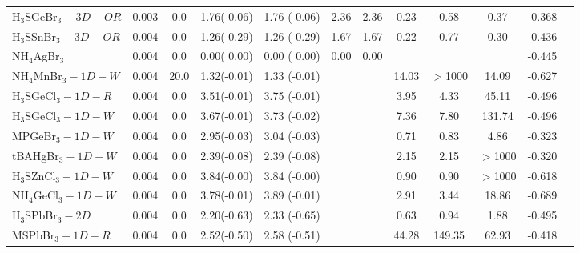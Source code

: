 \begin{table*}
\begin{tabular*}{0.98\textwidth}{@{\extracolsep{\fill}}l c c c c c c c c c c c}
H$_3$SGeBr$_3-3D-OR$&      0.003&        0.0&       1.76(-0.06)&            1.76  (-0.06)&       2.36&            2.36&            0.23&            0.58&            0.37&     -0.368\\
H$_3$SSnBr$_3-3D-OR$&      0.004&        0.0&       1.26(-0.29)&            1.26  (-0.29)&       1.67&            1.67&            0.22&            0.77&            0.30&     -0.436\\
      NH$_4$AgBr$_3$&      0.004&        0.0&       0.00( 0.00)&            0.00  ( 0.00)&       0.00&            0.00&                &                &                &     -0.445\\
 NH$_4$MnBr$_3-1D-W$&      0.004&       20.0&       1.32(-0.01)&            1.33  (-0.01)&           &                &           14.03&         $>$1000&           14.09&     -0.627\\
 H$_3$SGeCl$_3-1D-R$&      0.004&        0.0&       3.51(-0.01)&            3.75  (-0.01)&           &                &            3.95&            4.33&           45.11&     -0.496\\
 H$_3$SGeCl$_3-1D-W$&      0.004&        0.0&       3.67(-0.01)&            3.73  (-0.02)&           &                &            7.36&            7.80&          131.74&     -0.496\\
     MPGeBr$_3-1D-W$&      0.004&        0.0&       2.95(-0.03)&            3.04  (-0.03)&           &                &            0.71&            0.83&            4.86&     -0.323\\
    tBAHgBr$_3-1D-W$&      0.004&        0.0&       2.39(-0.08)&            2.39  (-0.08)&           &                &            2.15&            2.15&         $>$1000&     -0.320\\
 H$_3$SZnCl$_3-1D-W$&      0.004&        0.0&       3.84(-0.00)&            3.84  (-0.00)&           &                &            0.90&            0.90&         $>$1000&     -0.618\\
 NH$_4$GeCl$_3-1D-W$&      0.004&        0.0&       3.78(-0.01)&            3.89  (-0.01)&           &                &            2.91&            3.44&           18.86&     -0.689\\
   H$_3$SPbBr$_3-2D$&      0.004&        0.0&       2.20(-0.63)&            2.33  (-0.65)&           &                &            0.63&            0.94&            1.88&     -0.495\\
     MSPbBr$_3-1D-R$&      0.004&        0.0&       2.52(-0.50)&            2.58  (-0.51)&           &                &           44.28&          149.35&           62.93&     -0.418\\

\end{tabular*}
\end{table*}
